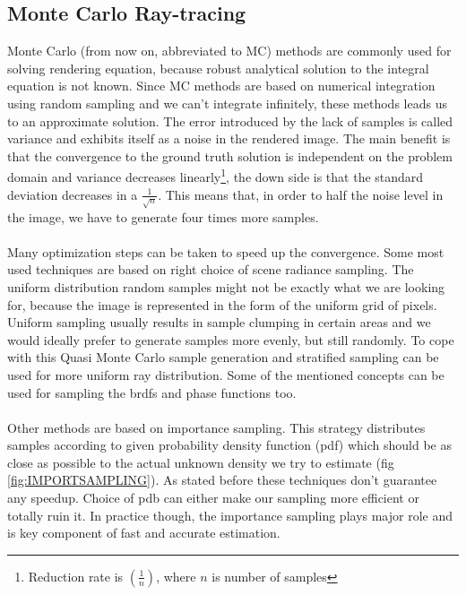 


\subsection{Monte Carlo Ray-tracing}
Monte Carlo (from now on, abbreviated to MC) methods are commonly used for solving rendering equation, because robust analytical solution to the integral equation is not known. Since MC methods are based on numerical integration using random sampling and we can't integrate infinitely, these methods leads us to an approximate solution. The error introduced by the lack of samples is called variance and exhibits itself as a noise in the rendered image. The main benefit is that the convergence to the ground truth solution is independent on the problem domain and variance decreases linearly\footnote{Reduction rate is $(\frac{1}{n})$, where $n$ is number of samples}, the down side is that the standard deviation decreases in a $\frac{1}{\sqrt{n}}$. This means that, in order to half the noise level in the image, we have to generate four times more samples.
\\
\\
Many optimization steps can be taken to speed up the convergence. Some most used techniques are based on right choice of scene radiance sampling. The uniform distribution random samples might not be exactly what we are looking for, because the image is represented in the form of the uniform grid of pixels. Uniform sampling usually results in sample clumping in certain areas and we would ideally prefer to generate samples more evenly, but still randomly. To cope with this Quasi Monte Carlo sample generation and stratified sampling can be used for more uniform ray distribution. Some of the mentioned concepts can be used for sampling the brdfs and phase functions too. 
\\
\\
Other methods are based on importance sampling. This strategy distributes samples according to given probability density function (pdf) which should be as close as possible to the actual unknown density we try to estimate (fig \ref{fig:IMPORTSAMPLING}). As stated before these techniques don't guarantee any speedup. Choice of pdb can either make our sampling more efficient or totally ruin it. In practice though, the importance sampling plays major role and is key component of fast and accurate estimation.


